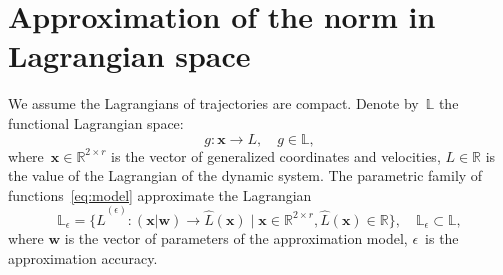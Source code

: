 \documentclass[12pt]{paper}
\begin{document}
\section{Approximation of the norm in Lagrangian space}
We assume the Lagrangians of trajectories are compact. 
Denote by~$\mathbb{L}$ the functional Lagrangian space:
\[ 
g: \mathbf{x} \to L, \quad g \in \mathbb{L},
\] 
where~$\mathbf{x} \in \mathbb{R}^{2 \times r}$ is the vector of generalized coordinates and velocities, $L \in \mathbb{R}$ is the value of the Lagrangian of the dynamic system. The parametric family of functions~\eqref{eq:model} approximate the Lagrangian
\[
 \mathbb{L}_{\epsilon} = \{ \hat{L}^{(\epsilon)} \colon (\mathbf{x} | \mathbf{w}) \to \hat{L}(\mathbf{x}) \mid \mathbf{x} \in \mathbb{R}^{2 \times r}, \hat{L}(\mathbf{x})  \in \mathbb{R}\}, \quad \mathbb{L}_{\epsilon} \subset \mathbb{L},
\]
where $\mathbf{w}$ is the vector of parameters of the approximation model, $\epsilon$~is the approximation accuracy.
\end{document}
